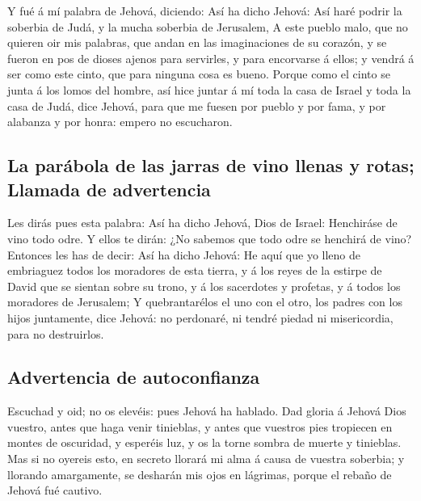  Y fué á mí palabra de Jehová, diciendo: 
Así ha dicho Jehová: Así haré podrir la soberbia de Judá, y la mucha
soberbia de Jerusalem,  A este pueblo malo, que no
quieren oir mis palabras, que andan en las imaginaciones de su corazón,
y se fueron en pos de dioses ajenos para servirles, y para encorvarse á
ellos; y vendrá á ser como este cinto, que para ninguna cosa es bueno.
 Porque como el cinto se junta á los lomos del hombre,
así hice juntar á mí toda la casa de Israel y toda la casa de Judá, dice
Jehová, para que me fuesen por pueblo y por fama, y por alabanza y por
honra: empero no escucharon.

\hypertarget{la-paruxe1bola-de-las-jarras-de-vino-llenas-y-rotas-llamada-de-advertencia}{%
\subsection{La parábola de las jarras de vino llenas y rotas; Llamada de
advertencia}\label{la-paruxe1bola-de-las-jarras-de-vino-llenas-y-rotas-llamada-de-advertencia}}

 Les dirás pues esta palabra: Así ha dicho Jehová, Dios
de Israel: Henchiráse de vino todo odre. Y ellos te dirán: ¿No sabemos
que todo odre se henchirá de vino?  Entonces les has de
decir: Así ha dicho Jehová: He aquí que yo lleno de embriaguez todos los
moradores de esta tierra, y á los reyes de la estirpe de David que se
sientan sobre su trono, y á los sacerdotes y profetas, y á todos los
moradores de Jerusalem;  Y quebrantarélos el uno con el
otro, los padres con los hijos juntamente, dice Jehová: no perdonaré, ni
tendré piedad ni misericordia, para no destruirlos.

\hypertarget{advertencia-de-autoconfianza}{%
\subsection{Advertencia de
autoconfianza}\label{advertencia-de-autoconfianza}}

 Escuchad y oid; no os elevéis: pues Jehová ha hablado.
 Dad gloria á Jehová Dios vuestro, antes que haga venir
tinieblas, y antes que vuestros pies tropiecen en montes de oscuridad, y
esperéis luz, y os la torne sombra de muerte y tinieblas.
 Mas si no oyereis esto, en secreto llorará mi alma á
causa de vuestra soberbia; y llorando amargamente, se desharán mis ojos
en lágrimas, porque el rebaño de Jehová fué cautivo.

